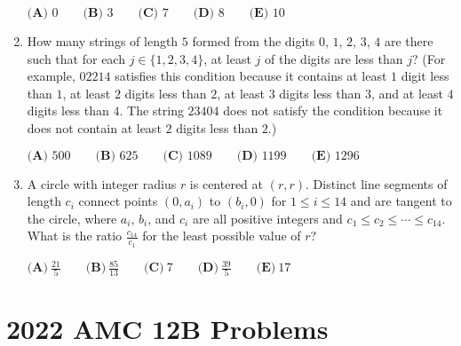 \documentclass{article}
\begin{document}
\begin{enumerate}[label=\arabic*., itemsep=0.5em]
\(\textbf{(A) }0 \qquad\textbf{(B) }3 \qquad\textbf{(C) }7 \qquad\textbf{(D) }8\qquad\textbf{(E) }10\)\par \vspace{0.5em}\item How many strings of length \(5\) formed from the digits \(0\), \(1\), \(2\), \(3\), \(4\) are there such that for each \(j \in \{1,2,3,4\}\), at least \(j\) of the digits are less than \(j\)? (For example, \(02214\) satisfies this condition
because it contains at least \(1\) digit less than \(1\), at least \(2\) digits less than \(2\), at least \(3\) digits less
than \(3\), and at least \(4\) digits less than \(4\). The string \(23404\) does not satisfy the condition because it
does not contain at least \(2\) digits less than \(2\).)

\(\textbf{(A) }500\qquad\textbf{(B) }625\qquad\textbf{(C) }1089\qquad\textbf{(D) }1199\qquad\textbf{(E) }1296\)\par \vspace{0.5em}\item A circle with integer radius \(r\) is centered at \((r, r)\). Distinct line segments of length \(c_i\) connect points \((0, a_i)\) to \((b_i, 0)\) for \(1 \le i \le 14\) and are tangent to the circle, where \(a_i\), \(b_i\), and \(c_i\) are all positive integers and \(c_1 \le c_2 \le \cdots \le c_{14}\). What is the ratio \(\frac{c_{14}}{c_1}\) for the least possible value of \(r\)?

\(\textbf{(A)} ~\frac{21}{5} \qquad\textbf{(B)} ~\frac{85}{13} \qquad\textbf{(C)} ~7 \qquad\textbf{(D)} ~\frac{39}{5} \qquad\textbf{(E)} ~17 \)\par \vspace{0.5em}
\end{enumerate}
\newpage\section*{2022 AMC 12B Problems}
\end{document}
